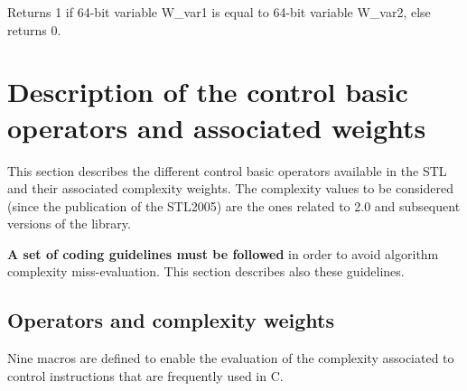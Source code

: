 
Returns 1 if 64-bit variable W\_var1 is equal to 64-bit variable W\_var2, else returns 0.

\section{Description of the control basic operators and associated weights}

This section describes the different control basic operators available in the STL and their associated complexity weights.
The complexity values to be considered (since the publication of the STL2005) are the ones related to 2.0 and subsequent versions of the library.

\textbf{A set of coding guidelines must be followed} in order to avoid algorithm complexity miss-evaluation.
This section describes also these guidelines.

\subsection{Operators and complexity weights}
Nine macros are defined to enable the evaluation of the complexity
associated to control instructions that are frequently used in C.

